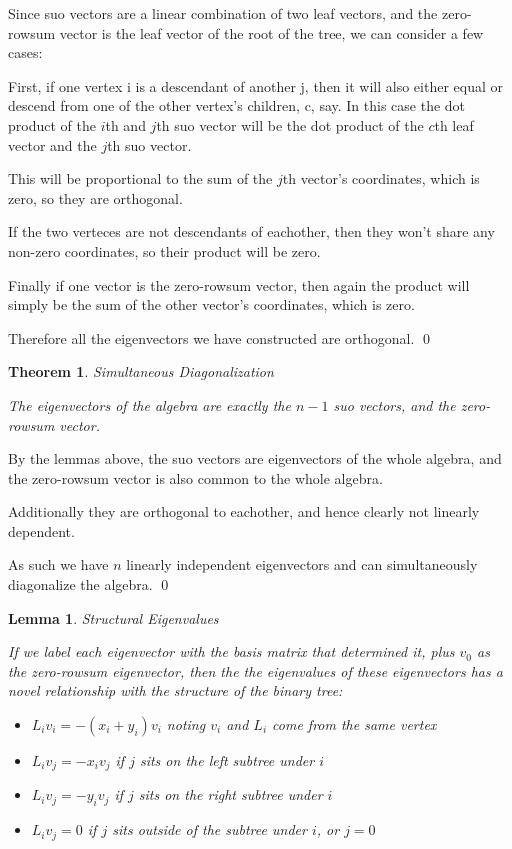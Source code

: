 \documentclass[10pt,a4paper]{report}
\newtheorem{theorem}{Theorem}
\newtheorem{lemma}{Lemma}
\begin{document}
Since suo vectors are a linear combination of two leaf vectors, and the
zero-rowsum vector is the leaf vector of the root of the tree, we can consider
a few cases:

First, if one vertex i is a descendant of another j, then it will also either
equal or descend from one of the other vertex's children, c, say.  In this case
the dot product of the $i$th and $j$th suo vector will be the dot product of
the $c$th leaf vector and the $j$th suo vector.

This will be proportional to the sum of the $j$th vector's coordinates, which
is zero, so they are orthogonal.

If the two verteces are not descendants of eachother, then they won't share any
non-zero coordinates, so their product will be zero.

Finally if one vector is the zero-rowsum vector, then again the product will
simply be the sum of the other vector's coordinates, which is zero.

Therefore all the eigenvectors we have constructed are orthogonal. \qed

\begin{theorem} Simultaneous Diagonalization

	The eigenvectors of the algebra are exactly the $n-1$ suo vectors, and the
	zero-rowsum vector.
\end{theorem}

By the lemmas above, the suo vectors are eigenvectors of the whole algebra, and
the zero-rowsum vector is also common to the whole algebra.

Additionally they are orthogonal to eachother, and hence clearly not linearly
dependent.

As such we have $n$ linearly independent eigenvectors and can simultaneously
diagonalize the algebra. \qed

\begin{lemma} Structural Eigenvalues

	If we label each eigenvector with the basis matrix that determined it, plus
	$v_0$ as the zero-rowsum eigenvector, then the the eigenvalues of these
	eigenvectors has a novel relationship with the structure of the binary
	tree:
	\begin{itemize}
		\item ${L_i}{v_i} = -(x_i + y_i)v_i$ noting $v_i$ and $L_i$ come from
			the same vertex
		\item ${L_i}{v_j} = -{x_i}{v_j}$ if $j$ sits on the left subtree under
			$i$
		\item ${L_i}{v_j} = -{y_i}{v_j}$ if $j$ sits on the right subtree under
			$i$
		\item ${L_i}{v_j} = 0$ if $j$ sits outside of the subtree under $i$, or
			$j=0$
	\end{itemize}
\end{lemma}
\end{document}

